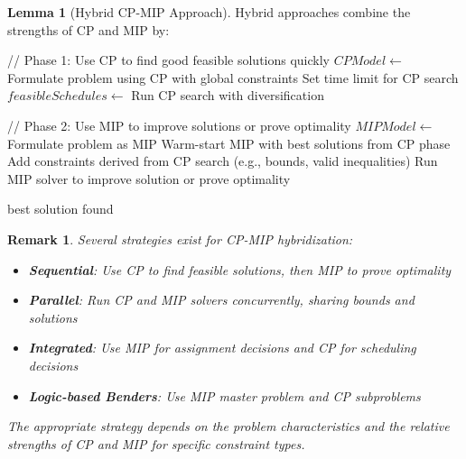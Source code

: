 \documentclass{article}
\newtheorem{remark}{Remark}
\theoremstyle{definition}
\newtheorem{lemma}{Lemma}
\begin{document}
\begin{lemma}[Hybrid CP-MIP Approach]
Hybrid approaches combine the strengths of CP and MIP by:

\begin{algorithm}
\caption{Hybrid CP-MIP for Scheduling}
\begin{algorithmic}[1]
    \State // Phase 1: Use CP to find good feasible solutions quickly
    \State $CPModel \gets$ Formulate problem using CP with global constraints
    \State Set time limit for CP search
    \State $feasibleSchedules \gets$ Run CP search with diversification
    
    \State // Phase 2: Use MIP to improve solutions or prove optimality
    \State $MIPModel \gets$ Formulate problem as MIP
    \State Warm-start MIP with best solutions from CP phase
    \State Add constraints derived from CP search (e.g., bounds, valid inequalities)
    \State Run MIP solver to improve solution or prove optimality
    
    \State \Return best solution found
\EndProcedure
\end{algorithmic}
\end{algorithm}

\begin{remark}
Several strategies exist for CP-MIP hybridization:
\begin{itemize}
    \item \textbf{Sequential}: Use CP to find feasible solutions, then MIP to prove optimality
    \item \textbf{Parallel}: Run CP and MIP solvers concurrently, sharing bounds and solutions
    \item \textbf{Integrated}: Use MIP for assignment decisions and CP for scheduling decisions
    \item \textbf{Logic-based Benders}: Use MIP master problem and CP subproblems
\end{itemize}

The appropriate strategy depends on the problem characteristics and the relative strengths of CP and MIP for specific constraint types.
\end{remark}
\end{lemma}
\end{document}
